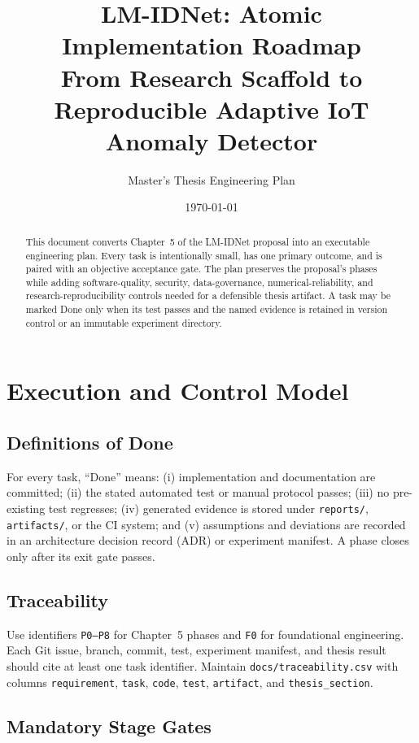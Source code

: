 \documentclass[11pt,a4paper]{article}
\title{LM-IDNet: Atomic Implementation Roadmap\\
\large From Research Scaffold to Reproducible Adaptive IoT Anomaly Detector}
\author{Master's Thesis Engineering Plan}
\date{\today}
\newcommand{\artifact}[1]{\texttt{#1}}
\begin{document}
\maketitle

\begin{abstract}
This document converts Chapter~5 of the LM-IDNet proposal into an executable engineering plan. Every task is intentionally small, has one primary outcome, and is paired with an objective acceptance gate. The plan preserves the proposal's phases while adding software-quality, security, data-governance, numerical-reliability, and research-reproducibility controls needed for a defensible thesis artifact. A task may be marked Done only when its test passes and the named evidence is retained in version control or an immutable experiment directory.
\end{abstract}

\tableofcontents
\newpage

\section{Execution and Control Model}

\subsection{Definitions of Done}

For every task, ``Done'' means: (i) implementation and documentation are committed; (ii) the stated automated test or manual protocol passes; (iii) no pre-existing test regresses; (iv) generated evidence is stored under \artifact{reports/}, \artifact{artifacts/}, or the CI system; and (v) assumptions and deviations are recorded in an architecture decision record (ADR) or experiment manifest. A phase closes only after its exit gate passes.

\subsection{Traceability}

Use identifiers \texttt{P0--P8} for Chapter~5 phases and \texttt{F0} for foundational engineering. Each Git issue, branch, commit, test, experiment manifest, and thesis result should cite at least one task identifier. Maintain \artifact{docs/traceability.csv} with columns \texttt{requirement}, \texttt{task}, \texttt{code}, \texttt{test}, \texttt{artifact}, and \texttt{thesis\_section}.

\subsection{Mandatory Stage Gates}
\end{document}
